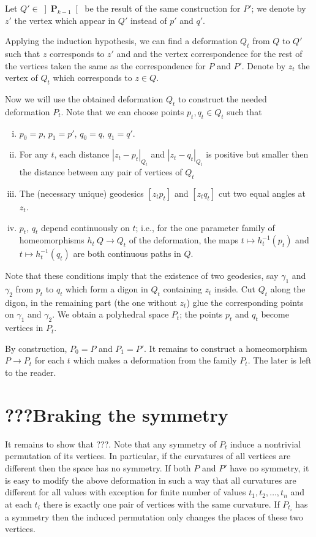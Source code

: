 Let $Q'\in\left]\mathbf{P}_{k-1}\right[$ be the result 
of the same construction for $P'$;
we denote by $z'$ the vertex which appear in $Q'$ instead of $p'$ and $q'$.

Applying the induction hypothesis, we can find a deformation $Q_t$ from $Q$ to $Q'$ 
such that $z$ corresponds to $z'$
and and the vertex correspondence for the rest of the vertices taken the same as the correspondence for $P$ and $P'$.
Denote by $z_t$ the vertex of $Q_t$ which corresponds to $z\in Q$.

Now we will use the obtained deformation $Q_t$
to construct the needed deformation $P_t$.
Note that we can choose points $p_t, q_t\in Q_t$ such that 
\begin{enumerate}[(i)]
\item $p_0=p$, $p_1=p'$, $q_0=q$, $q_1=q'$.
\item For any $t$, each distance $|z_t-p_t|_{Q_t}$ and $|z_t-q_t|_{Q_t}$ is positive
but smaller then the distance between any pair of vertices of $Q_t$
\item The (necessary unique) geodesics $[z_tp_t]$ and $[z_tq_t]$ cut two equal angles at $z_t$.
\item $p_t$, $q_t$ depend continuously on $t$; 
i.e., for the one parameter family of homeomorphisms $h_t\:Q\to Q_t$ of the deformation,
the maps $t\mapsto h^{-1}_t(p_t)$ and $t\mapsto h^{-1}_t(q_t)$ are both continuous paths in $Q$.
\end{enumerate}

Note that these conditions imply that the existence of two geodesics,
say $\gamma_1$ and $\gamma_2$
from $p_t$ to $q_t$ which form a digon in $Q_t$ containing $z_t$ inside. 
Cut $Q_t$ along the digon, 
in the remaining part (the one without $z_t$)
glue the corresponding points on $\gamma_1$ and $\gamma_2$.
We obtain a polyhedral space $P_t$;
the points $p_t$ and $q_t$ become vertices in $P_t$.

By construction, $P_0= P$ and $P_1= P'$.
It remains to construct a homeomorphism $P\to P_t$ for each $t$ which makes a deformation from the family $P_t$.
The later is left to the reader.
\qeds






\section{???Braking the symmetry}

It remains to show that ???.
Note that any symmetry of $P_t$ 
induce a nontrivial permutation of its vertices.
In particular, if the curvatures of all vertices are different then the space has no symmetry.
If both $P$ and $P'$ have no symmetry, it is easy to modify the above deformation in such a way that all curvatures are different
for all values with exception for finite number of values $t_1,t_2,\dots,t_n$
and at each $t_i$ there is exactly one pair of vertices with the same curvature.
If $P_{t_i}$ has a symmetry then the induced permutation only changes the places of these two vertices.



